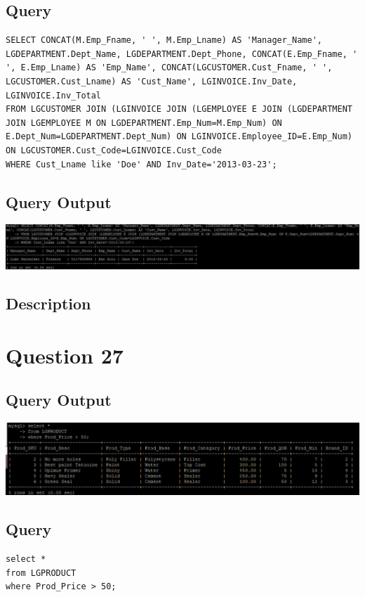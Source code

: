 \documentclass[a4paper,10pt]{article}
\begin{document}
 \subsection{Query}
          \lstset{
            language=SQL,
            breaklines=true
            }
        \begin{lstlisting}[frame=single]
        SELECT CONCAT(M.Emp_Fname, ' ', M.Emp_Lname) AS 'Manager_Name', LGDEPARTMENT.Dept_Name, LGDEPARTMENT.Dept_Phone, CONCAT(E.Emp_Fname, ' ', E.Emp_Lname) AS 'Emp_Name', CONCAT(LGCUSTOMER.Cust_Fname, ' ', LGCUSTOMER.Cust_Lname) AS 'Cust_Name', LGINVOICE.Inv_Date, LGINVOICE.Inv_Total
FROM LGCUSTOMER JOIN (LGINVOICE JOIN (LGEMPLOYEE E JOIN (LGDEPARTMENT JOIN LGEMPLOYEE M ON LGDEPARTMENT.Emp_Num=M.Emp_Num) ON E.Dept_Num=LGDEPARTMENT.Dept_Num) ON LGINVOICE.Employee_ID=E.Emp_Num) ON LGCUSTOMER.Cust_Code=LGINVOICE.Cust_Code
WHERE Cust_Lname like 'Doe' AND Inv_Date='2013-03-23';

        \end{lstlisting}
\subsection{Query Output}
           \includegraphics{Queries/Question_26/Q26_screenshot.jpg}
\subsection{Description}
\section*{Question 27}
\subsection{Query Output}
           \includegraphics{Queries/Question_27/Question_27_screenshot.PNG}
 \subsection{Query}
          \lstset{
            language=SQL,
            breaklines=true
            }
        \begin{lstlisting}[frame=single]
        select * 
from LGPRODUCT 
where Prod_Price > 50;
        \end{lstlisting}
\end{document}
